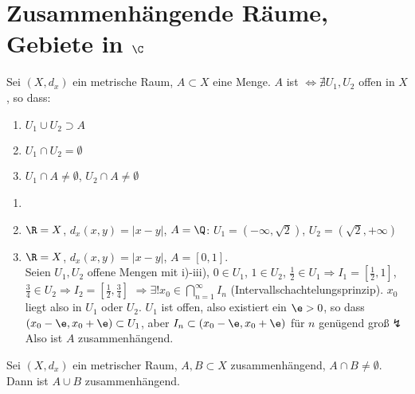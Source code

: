 \chapter{Zusammenh\"angende R\"aume,\\Gebiete in $ \C $}
\begin{definition}
Sei $ (X, d_x) $ ein metrische Raum, $ A\subset X $ eine Menge. $ A $ ist $ \Leftrightarrow\nexists U_1,U_2 $ offen in $ X $, so dass:
\begin{enumerate}
\item $ U_1\cup U_2\supset A $
\item $ U_1\cap U_2=\emptyset $
\item $ U_1\cap A\neq\emptyset $, $ U_2\cap A\neq\emptyset $
\end{enumerate}
\end{definition}
\begin{beispiel*}
\begin{enumerate}
\item[]
\item $ \R=X $, $ d_x(x,y)=|x-y| $, $ A=\Q $: $ U_1=(-\infty,\sqrt{2}) $, $ U_2=(\sqrt{2},+\infty) $
\item $ \R=X $, $ d_x(x,y)=|x-y| $, $ A=[0,1] $.\\
Seien $ U_1,U_2 $ offene Mengen mit i)-iii), $ 0\in U_1 $, $ 1\in U_2 $, $ \frac{1}{2}\in U_1 \Rightarrow I_1=\left[\frac{1}{2},1\right]$, $ \frac{3}{4}\in U_2\Rightarrow I_2=\left[\frac{1}{2},\frac{3}{4}\right]$ $\Rightarrow\exists! x_0\in\bigcap_{n=1}^\infty I_n $ (Intervallschachtelungsprinzip). $ x_0 $ liegt also in $ U_1 $ oder $ U_2 $. $ U_1 $ ist offen, also existiert ein $ \e>0 $, so dass $ (x_0-\e,x_0+\e)\subset U_1 $, aber $ I_n\subset(x_0-\e,x_0+\e) $ f\"ur $ n $ gen\"ugend gro\ss $\lightning $ Also ist $ A $ zusammenh\"angend.
\end{enumerate} 
\end{beispiel*}
\begin{bemerkung*}
Sei $ (X,d_x) $ ein metrischer Raum, $ A,B\subset X $ zusammenh\"angend, $ A\cap B\neq\emptyset $. Dann ist $ A\cup B $ zusammenh\"angend.
\end{bemerkung*}
